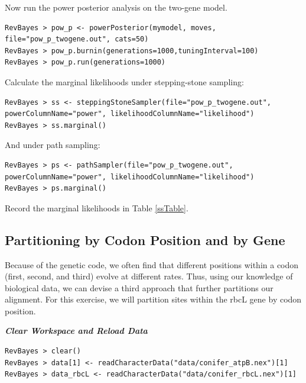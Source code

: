 \documentclass[11pt]{article}
\begin{document}
Now run the power posterior analysis on the two-gene model.
{\tt \begin{snugshade*}
\begin{lstlisting}
RevBayes > pow_p <- powerPosterior(mymodel, moves, file="pow_p_twogene.out", cats=50) 
RevBayes > pow_p.burnin(generations=1000,tuningInterval=100)
RevBayes > pow_p.run(generations=1000)  
\end{lstlisting}
\end{snugshade*}}

Calculate the marginal likelihoods under stepping-stone sampling:
{\tt \begin{snugshade*}
\begin{lstlisting}
RevBayes > ss <- steppingStoneSampler(file="pow_p_twogene.out", powerColumnName="power", likelihoodColumnName="likelihood")
RevBayes > ss.marginal() 
\end{lstlisting}
\end{snugshade*}}

And under path sampling:
{\tt \begin{snugshade*}
\begin{lstlisting}
RevBayes > ps <- pathSampler(file="pow_p_twogene.out", powerColumnName="power", likelihoodColumnName="likelihood")
RevBayes > ps.marginal() 
\end{lstlisting}
\end{snugshade*}}

Record the marginal likelihoods in Table \ref{ssTable}.



\bigskip
\subsection{Partitioning by Codon Position and by Gene}\label{secExtremeP}

Because of the genetic code, we often find that different positions within a codon (first, second, and third) evolve at different rates.
Thus, using our knowledge of biological data, we can devise a third approach that further partitions our alignment. 
For this exercise, we will partition sites within the rbcL gene by codon position.

\textbf{\textit{Clear Workspace and Reload Data}}

{\tt \begin{snugshade*}
\begin{lstlisting}
RevBayes > clear()
RevBayes > data[1] <- readCharacterData("data/conifer_atpB.nex")[1]
RevBayes > data_rbcL <- readCharacterData("data/conifer_rbcL.nex")[1]
\end{lstlisting}
\end{snugshade*}}
\end{document}
